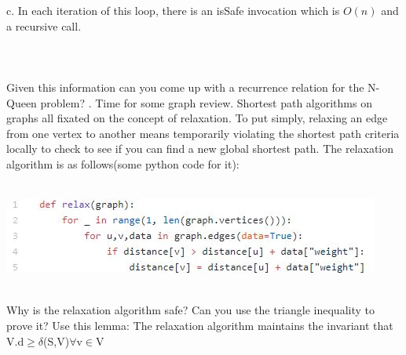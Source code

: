 \documentclass[12pt]{article}
\begin{document}
c. In each iteration of this loop, there is an isSafe invocation which is $O(n)$ and a recursive call.\\\\\\\\
Given this information can you come up with a recurrence relation for the N-Queen problem?
\newpage
{}. Time for some graph review. Shortest path algorithms on graphs all fixated 
on the concept of relaxation. To put simply, relaxing an edge from
one vertex to another means temporarily violating the shortest path
criteria locally to check to see if you can find a new global shortest path.
The relaxation algorithm is as follows(some python code for it):\\\\
\centerline{\includegraphics{relax.jpg}}\\
Why is the relaxation algorithm safe? Can you use the triangle inequality to
 prove it? Use this lemma: The relaxation algorithm maintains the 
 invariant that V.d$ \geq \delta$(S,V)$ \forall $v$ \in $V\\\\\\\\
\end{document}
